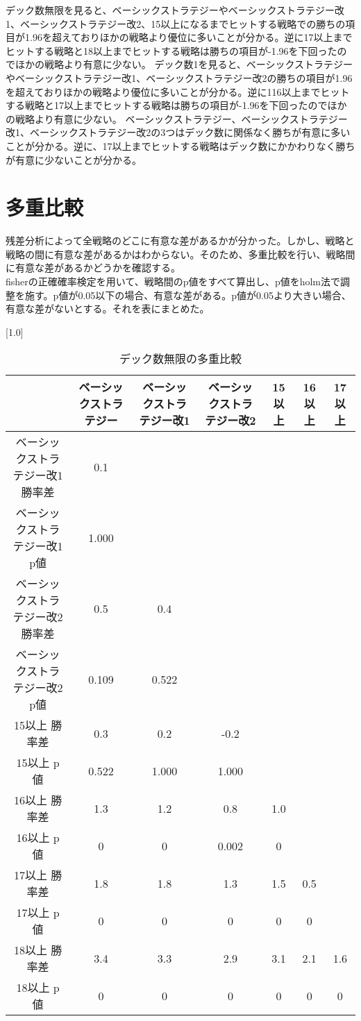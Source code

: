 デック数無限を見ると、ベーシックストラテジーやベーシックストラテジー改1、ベーシックストラテジー改2、15以上になるまでヒットする戦略での勝ちの項目が1.96を超えておりほかの戦略より優位に多いことが分かる。逆に17以上までヒットする戦略と18以上までヒットする戦略は勝ちの項目が-1.96を下回ったのでほかの戦略より有意に少ない。
デック数1を見ると、ベーシックストラテジーやベーシックストラテジー改1、ベーシックストラテジー改2の勝ちの項目が1.96を超えておりほかの戦略より優位に多いことが分かる。逆に116以上までヒットする戦略と17以上までヒットする戦略は勝ちの項目が-1.96を下回ったのでほかの戦略より有意に少ない。
ベーシックストラテジー、ベーシックストラテジー改1、ベーシックストラテジー改2の3つはデック数に関係なく勝ちが有意に多いことが分かる。逆に、17以上までヒットする戦略はデック数にかかわりなく勝ちが有意に少ないことが分かる。
\section{多重比較}
残差分析によって全戦略のどこに有意な差があるかが分かった。しかし、戦略と戦略の間に有意な差があるかはわからない。そのため、多重比較を行い、戦略間に有意な差があるかどうかを確認する。\\
fisherの正確確率検定を用いて、戦略間のp値をすべて算出し、p値をholm法で調整を施す。p値が0.05以下の場合、有意な差がある。p値が0.05より大きい場合、有意な差がないとする。それを表にまとめた。
\begin{table}[H]
 \begin{center}
 \small
 \scalebox{0.8}[1.0]{
  \begin{tabular}{|c|c|c|c|c|c|c|}
    \hline & ベーシックストラテジー & ベーシックストラテジー改1 & ベーシックストラテジー改2 & 15以上 & 16以上 & 17以上 \\
    \hline ベーシックストラテジー改1 勝率差 & 0.1 &  &  &  &  &   \\
    ベーシックストラテジー改1 p値 & 1.000 &  &  &  &  &    \\
    \hline ベーシックストラテジー改2 勝率差 & 0.5 & 0.4 & & & &  \\
    ベーシックストラテジー改2 p値 & 0.109 & 0.522 & & & &   \\
    \hline 15以上 勝率差 & 0.3 & 0.2 & -0.2 & & &   \\
    15以上 p値 & 0.522 & 1.000 & 1.000 & & &  \\
    \hline 16以上 勝率差 & 1.3 & 1.2 & 0.8 & 1.0 & &  \\
    16以上 p値 & 0 & 0 & 0.002 & 0 & &  \\
    \hline 17以上 勝率差 & 1.8 & 1.8 & 1.3 & 1.5 & 0.5 &  \\
    17以上 p値 & 0 & 0 & 0 & 0 & 0 & \\
    \hline 18以上 勝率差 & 3.4 & 3.3 & 2.9 & 3.1 & 2.1 & 1.6  \\
    18以上 p値 & 0 & 0 & 0 & 0 & 0 & 0  \\
    \hline
  \end{tabular}
 }
 \end{center}
 \caption{デック数無限の多重比較}
\end{table}
